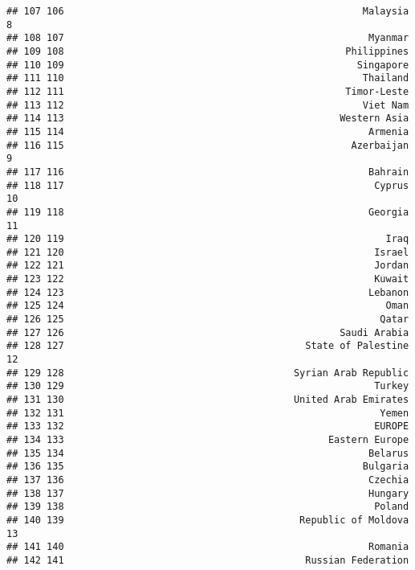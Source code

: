 \documentclass[]{article}
\begin{document}
\begin{verbatim}
## 107 106                                                    Malaysia  8
## 108 107                                                     Myanmar   
## 109 108                                                 Philippines   
## 110 109                                                   Singapore   
## 111 110                                                    Thailand   
## 112 111                                                 Timor-Leste   
## 113 112                                                    Viet Nam   
## 114 113                                                Western Asia   
## 115 114                                                     Armenia   
## 116 115                                                  Azerbaijan  9
## 117 116                                                     Bahrain   
## 118 117                                                      Cyprus 10
## 119 118                                                     Georgia 11
## 120 119                                                        Iraq   
## 121 120                                                      Israel   
## 122 121                                                      Jordan   
## 123 122                                                      Kuwait   
## 124 123                                                     Lebanon   
## 125 124                                                        Oman   
## 126 125                                                       Qatar   
## 127 126                                                Saudi Arabia   
## 128 127                                          State of Palestine 12
## 129 128                                        Syrian Arab Republic   
## 130 129                                                      Turkey   
## 131 130                                        United Arab Emirates   
## 132 131                                                       Yemen   
## 133 132                                                      EUROPE   
## 134 133                                              Eastern Europe   
## 135 134                                                     Belarus   
## 136 135                                                    Bulgaria   
## 137 136                                                     Czechia   
## 138 137                                                     Hungary   
## 139 138                                                      Poland   
## 140 139                                         Republic of Moldova 13
## 141 140                                                     Romania   
## 142 141                                          Russian Federation   

\end{verbatim}
\end{document}
